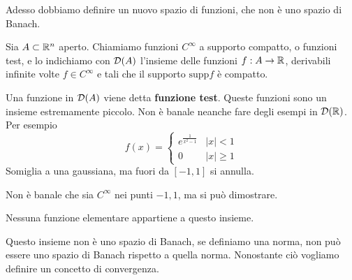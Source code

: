 Adesso dobbiamo definire un nuovo spazio di funzioni, che non è uno spazio di Banach.
\begin{defn}
Sia $A\subset \mathbb{R}^{n}$ aperto. Chiamiamo funzioni $C^{\infty}$ a supporto compatto, o funzioni test, e lo indichiamo con $\mathcal{D}(A)$ l'insieme delle funzioni $f: A\rightarrow \mathbb{R}$, derivabili infinite volte $f\in C^{\infty}$ e tali che il supporto $\mathrm{supp} f$ è compatto.
\end{defn}
Una funzione in $\mathcal{D}(A)$ viene detta \textbf{funzione test}. Queste funzioni sono un insieme estremamente piccolo. Non è banale neanche fare degli esempi in $\mathcal{D}(\mathbb{R})$. Per esempio
\begin{equation*}
f(x) =
\begin{cases}
e^{\frac{1}{x^{2} - 1}} & | x| < 1\\
0 & | x| \geq 1
\end{cases}
\end{equation*}
Somiglia a una gaussiana, ma fuori da $[- 1, 1]$ si annulla.


Non è banale che sia $C^{\infty}$ nei punti $ - 1, 1$, ma si può dimostrare.

Nessuna funzione elementare appartiene a questo insieme.

Questo insieme non è uno spazio di Banach, se definiamo una norma, non può essere uno spazio di Banach rispetto a quella norma. Nonostante ciò vogliamo definire un concetto di convergenza.

